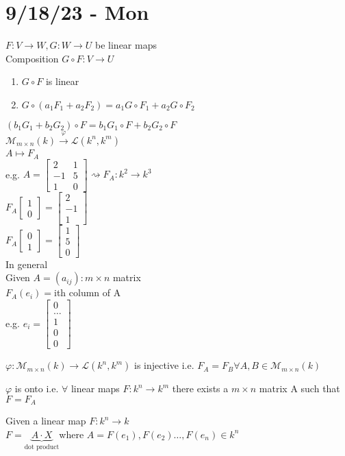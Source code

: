 \documentclass{article}
\newcommand\m[1]{\begin{bmatrix}#1\end{bmatrix}}
\newcommand{\cd}{\cdot}
\newcommand{\mn}{m \times n}
\newenvironment{lemma}[2][Lemma]{\begin{trivlist}
\item[\hskip \labelsep {\bfseries #1}\hskip \labelsep {\bfseries #2.}]}{\end{trivlist}}
\begin{document}
\section{9/18/23 - Mon}
$F: V\to W, G:W \to U$ be linear maps\\
Composition $G \circ F:V \to U$
\begin{enumerate}
    \item $G\circ F$ is linear\\
    \item $G \circ (a_1F_1+a_2F_2)=a_1G\circ F_1+a_2 G \circ F_2$

\end{enumerate}
$(b_1G_1+b_2G_2)\circ F=b_1G_1\circ F +b_2G_2\circ F$
\\
$\mathcal{M}_{\mn}(k) \xrightarrow[]{\varphi} \mathcal{L}(k^n,k^m)$
\\$A \mapsto F_A$
\\e.g. $A=\m{2&1\\-1&5\\1&0} \rightsquigarrow F_A:k^2\to k^3$\\
$F_A\m{1\\0}=\m{2\\-1\\1}$\\
$F_A\m{0\\1}=\m{1\\5\\0}$
\\In general\\
Given $A=(a_{ij}): \mn $ matrix\\
$F_A(e_i)=$ith column of A\\
e.g. $e_i=\m{0\\\dots\\1\\0\\0}$
\\
\begin{theorem}
    $\varphi: \mathcal{M}_{\mn}(k) \to \mathcal{L}(k^n,k^m)$ is injective i.e. $F_A=F_B \forall A ,B \in $$\mathcal{M}_{\mn}(k)$
    \\
\end{theorem}
\begin{theorem}
  $  \varphi$ is onto i.e. $\forall $ linear maps $F:k^n \to k^m$ there exists a $\mn$ matrix A such that $F=F_A$
\end{theorem}
\begin{lemma}
    {} Given a linear map $F:k^n\to k$\\
    $F=\underbrace{A\cd X}_{\text{dot product}}$where $A=F(e_1),F(e_2)\dots,F(e_n) \in k^n$\\
    
\end{lemma}
\end{document}

